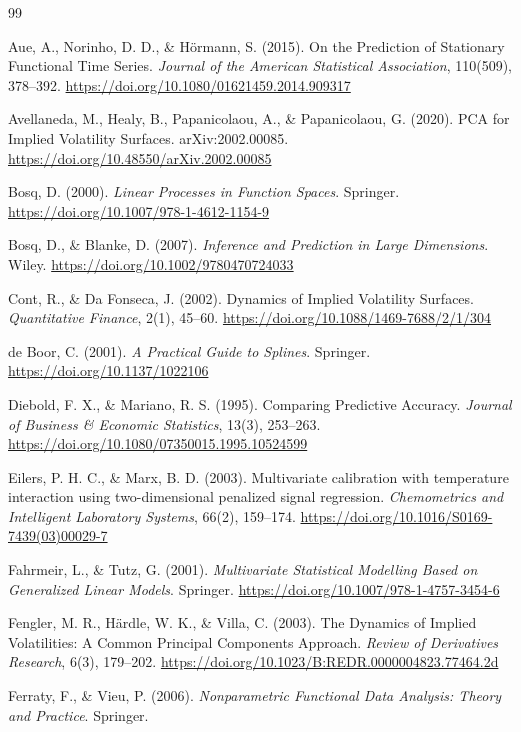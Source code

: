 \documentclass[a4paper,11pt]{article}
\begin{document}
\begin{thebibliography}{99}

Aue, A., Norinho, D. D., \& Hörmann, S. (2015). On the Prediction of Stationary Functional Time Series. \emph{Journal of the American Statistical Association}, 110(509), 378--392. \url{https://doi.org/10.1080/01621459.2014.909317}

Avellaneda, M., Healy, B., Papanicolaou, A., \& Papanicolaou, G. (2020). PCA for Implied Volatility Surfaces. arXiv:2002.00085. \url{https://doi.org/10.48550/arXiv.2002.00085}

Bosq, D. (2000). \emph{Linear Processes in Function Spaces}. Springer. \url{https://doi.org/10.1007/978-1-4612-1154-9}

Bosq, D., \& Blanke, D. (2007). \emph{Inference and Prediction in Large Dimensions}. Wiley. \url{https://doi.org/10.1002/9780470724033}

Cont, R., \& Da Fonseca, J. (2002). Dynamics of Implied Volatility Surfaces. \emph{Quantitative Finance}, 2(1), 45--60. \url{https://doi.org/10.1088/1469-7688/2/1/304}

de Boor, C. (2001). \emph{A Practical Guide to Splines}. Springer. \url{https://doi.org/10.1137/1022106}

Diebold, F. X., \& Mariano, R. S. (1995). Comparing Predictive Accuracy. \emph{Journal of Business \& Economic Statistics}, 13(3), 253--263. \url{https://doi.org/10.1080/07350015.1995.10524599}

Eilers, P. H. C., \& Marx, B. D. (2003). Multivariate calibration with temperature interaction using two-dimensional penalized signal regression. \emph{Chemometrics and Intelligent Laboratory Systems}, 66(2), 159--174. \url{https://doi.org/10.1016/S0169-7439(03)00029-7}

Fahrmeir, L., \& Tutz, G. (2001). \emph{Multivariate Statistical Modelling Based on Generalized Linear Models}. Springer. \url{https://doi.org/10.1007/978-1-4757-3454-6}

Fengler, M. R., Härdle, W. K., \& Villa, C. (2003). The Dynamics of Implied Volatilities: A Common Principal Components Approach. \emph{Review of Derivatives Research}, 6(3), 179--202. \url{https://doi.org/10.1023/B:REDR.0000004823.77464.2d}

Ferraty, F., \& Vieu, P. (2006). \emph{Nonparametric Functional Data Analysis: Theory and Practice}. Springer.


\end{thebibliography}
\end{document}
